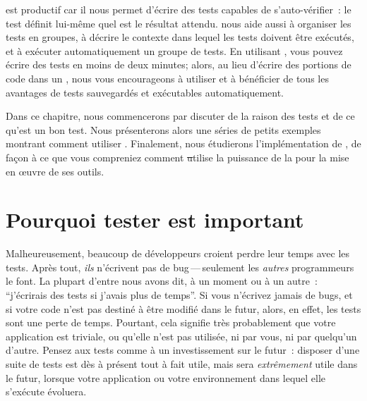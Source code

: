 \documentclass[a4paper,10pt,twoside]{book}
\begin{document}
\sunit est productif car il nous permet d'écrire des tests capables de s'auto-vérifier~: le test définit lui-même quel est le résultat attendu. \sunit nous aide aussi à organiser les tests en groupes, à décrire le contexte dans lequel les tests doivent être exécutés, et à exécuter automatiquement un groupe de tests. En utilisant \sunit, vous pouvez écrire des tests en moins de deux minutes; alors, au lieu d'écrire des portions de code dans un , nous vous encourageons à utiliser \sunit et à bénéficier de tous les avantages de tests sauvegardés et exécutables automatiquement.

Dans ce chapitre, nous commencerons par discuter de la raison des tests et de ce qu'est un bon test. 
Nous présenterons alors une séries de petits exemples montrant comment utiliser \sunit. 
Finalement, nous étudierons l'implémentation de \sunit, de façon à ce que vous compreniez 
comment \st utilise la puissance de la  pour la mise en {\oe}uvre de ses outils.


\section{Pourquoi tester est important}

Malheureusement, beaucoup de développeurs croient perdre leur temps avec les tests. 
Après tout, \emph{ils} n'écrivent pas de bug\,---\,seulement les \emph{autres} programmeurs 
le font. La plupart d'entre nous avons dit, à un moment ou à un autre~: ``j'écrirais des tests 
si j'avais plus de temps''. Si vous n'écrivez jamais de bugs, et si votre code n'est pas 
destiné à être modifié dans le futur, alors, en effet, les tests sont une perte de temps. 
Pourtant, cela signifie très probablement que votre application est triviale, ou qu'elle 
n'est pas utilisée, ni par vous, ni par quelqu'un d'autre. Pensez aux tests comme à un 
investissement sur le futur~: disposer d'une suite de tests est dès à présent tout à fait 
utile, mais sera \emph{extrêmement} utile dans le futur, lorsque votre application ou votre 
environnement dans lequel elle s'exécute évoluera. 
\end{document}

